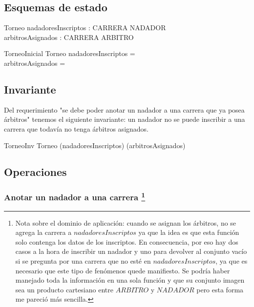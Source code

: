 \documentclass{article}
\begin{document}
\begin{zed}
\end{zed}

\subsection*{Esquemas de estado}

\begin{schema}{Torneo}
nadadoresInscriptos : CARRERA \pfun \power NADADOR \\
arbitrosAsignados : CARRERA \pfun \power ARBITRO
\end{schema}

\begin{schema}{TorneoInicial}
Torneo
\where
nadadoresInscriptos = \emptyset \\
arbitrosAsignados = \emptyset
\end{schema}

\subsection*{Invariante}
Del requerimiento "se debe poder anotar un nadador a una carrera que ya posea árbitros" tenemos el
siguiente invariante: un nadador no se puede inscribir a una carrera que todavía no tenga árbitros
asignados.

\begin{schema}{TorneoInv}
Torneo
\where
\dom(nadadoresInscriptos) \subseteq \dom(arbitrosAsignados)
\end{schema}

\subsection*{Operaciones}
\subsubsection*{Anotar un nadador a una carrera \protect\footnote{Nota sobre el dominio de aplicación: cuando se asignan los árbitros, no se agrega
la carrera a $nadadoresInscriptos$ ya que la idea es que esta función solo contenga
los datos de los inscriptos. En consecuencia, por eso hay dos casos a la hora 
de inscribir un nadador y uno para devolver al conjunto vacío si se pregunta
por una carrera que no esté en $nadadoresInscriptos$, ya que es necesario
que este tipo de fenómenos quede manifiesto. Se podría haber manejado toda la
información en una sola función y que su conjunto imagen sea un producto cartesiano
entre $ARBITRO$ y $NADADOR$ pero esta forma me pareció más sencilla.} }
\end{document}
